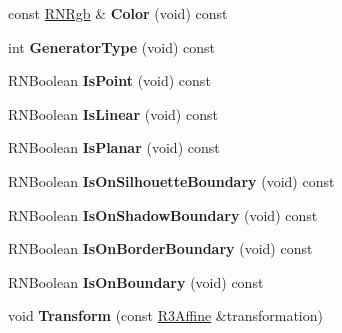 \begin{DoxyCompactItemize}
\item 
const \hyperlink{class_r_n_rgb}{R\+N\+Rgb} \& {\bfseries Color} (void) const \hypertarget{struct_f_e_t_feature_acd0a0dc7f7cc30b84028d6a5620fb39b}{}\label{struct_f_e_t_feature_acd0a0dc7f7cc30b84028d6a5620fb39b}

\item 
int {\bfseries Generator\+Type} (void) const \hypertarget{struct_f_e_t_feature_a6f01d3ed0c59f44c87a59446d76e2991}{}\label{struct_f_e_t_feature_a6f01d3ed0c59f44c87a59446d76e2991}

\item 
R\+N\+Boolean {\bfseries Is\+Point} (void) const \hypertarget{struct_f_e_t_feature_a6ebd25e4d7c1f2cf3b6e9845b9714f78}{}\label{struct_f_e_t_feature_a6ebd25e4d7c1f2cf3b6e9845b9714f78}

\item 
R\+N\+Boolean {\bfseries Is\+Linear} (void) const \hypertarget{struct_f_e_t_feature_a3f05704b52b0949a9d21c2278df22d20}{}\label{struct_f_e_t_feature_a3f05704b52b0949a9d21c2278df22d20}

\item 
R\+N\+Boolean {\bfseries Is\+Planar} (void) const \hypertarget{struct_f_e_t_feature_a1c96fe3af6e2eb39892559ea74524de5}{}\label{struct_f_e_t_feature_a1c96fe3af6e2eb39892559ea74524de5}

\item 
R\+N\+Boolean {\bfseries Is\+On\+Silhouette\+Boundary} (void) const \hypertarget{struct_f_e_t_feature_a4ddd0a670cf37ad4ac8dac9959b2def4}{}\label{struct_f_e_t_feature_a4ddd0a670cf37ad4ac8dac9959b2def4}

\item 
R\+N\+Boolean {\bfseries Is\+On\+Shadow\+Boundary} (void) const \hypertarget{struct_f_e_t_feature_ac4b321df76990c44260c7cc6e8e7fb44}{}\label{struct_f_e_t_feature_ac4b321df76990c44260c7cc6e8e7fb44}

\item 
R\+N\+Boolean {\bfseries Is\+On\+Border\+Boundary} (void) const \hypertarget{struct_f_e_t_feature_afbc781297e1f007dd8c1f87c52617492}{}\label{struct_f_e_t_feature_afbc781297e1f007dd8c1f87c52617492}

\item 
R\+N\+Boolean {\bfseries Is\+On\+Boundary} (void) const \hypertarget{struct_f_e_t_feature_abef855208a936912f225e5bf62dee1ef}{}\label{struct_f_e_t_feature_abef855208a936912f225e5bf62dee1ef}

\item 
void {\bfseries Transform} (const \hyperlink{class_r3_affine}{R3\+Affine} \&transformation)\hypertarget{struct_f_e_t_feature_a45a4b84058d171a69699af4371faa44e}{}\label{struct_f_e_t_feature_a45a4b84058d171a69699af4371faa44e}


\end{DoxyCompactItemize}
